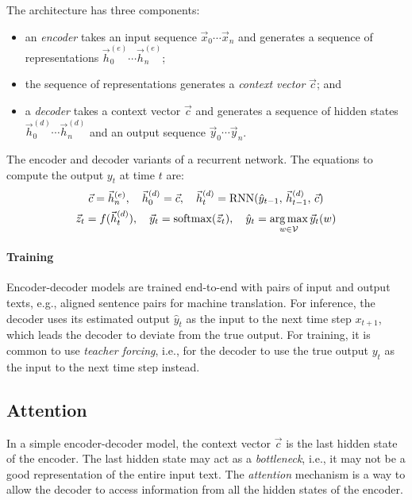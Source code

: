 The architecture has three components:
\begin{itemize}
  \item an \textit{encoder} takes an input sequence $\vec{x}_0 \cdots \vec{x}_n$
        and generates a sequence of representations
        $\vec{h}^{(e)}_0 \cdots \vec{h}^{(e)}_n$;
  \item the sequence of representations generates a \textit{context vector}
        $\vec{c}$; and
  \item a \textit{decoder} takes a context vector $\vec{c}$ and generates a
        sequence of hidden states $\vec{h}^{(d)}_0 \cdots \vec{h}^{(d)}_n$ and
        an output sequence $\vec{y}_0 \cdots \vec{y}_n$.
\end{itemize}
The encoder and decoder variants of a recurrent network.
The equations to compute the output $y_t$ at time $t$ are:
\begin{multline}
  \vec{c}
  = \vec{h}^{(e)}_n
  ,\quad
  \vec{h}^{(d)}_{0}
  = \vec{c}
  ,\quad
  \vec{h}^{(d)}_t
  = \text{RNN}(\hat{y}_{t - 1},\, \vec{h}^{(d)}_{t - 1},\, \vec{c})
  \\
  \vec{z}_t
  = f(\vec{h}^{(d)}_t)
  ,\quad
  \vec{y}_t
  = \operatorname{softmax}(\vec{z}_t)
  ,\quad
  \hat{y}_t
  = \operatorname*{arg\,max}_{w \in \mathcal{V}} \vec{y}_t(w)
\end{multline}

\paragraph{Training}

Encoder-decoder models are trained end-to-end with pairs of input and output
texts, e.g., aligned sentence pairs for machine translation.
For inference, the decoder uses its estimated output $\hat{y}_t$ as the input
to the next time step $x_{t + 1}$, which leads the decoder to deviate from the
true output.
For training, it is common to use \textit{teacher forcing}, i.e., for the
decoder to use the true output $y_t$ as the input to the next time step
instead.

\subsection{Attention}

In a simple encoder-decoder model, the context vector $\vec{c}$ is the last
hidden state of the encoder.
The last hidden state may act as a \textit{bottleneck}, i.e., it may not be a
good representation of the entire input text.
The \textit{attention} mechanism is a way to allow the decoder to access
information from all the hidden states of the encoder.

